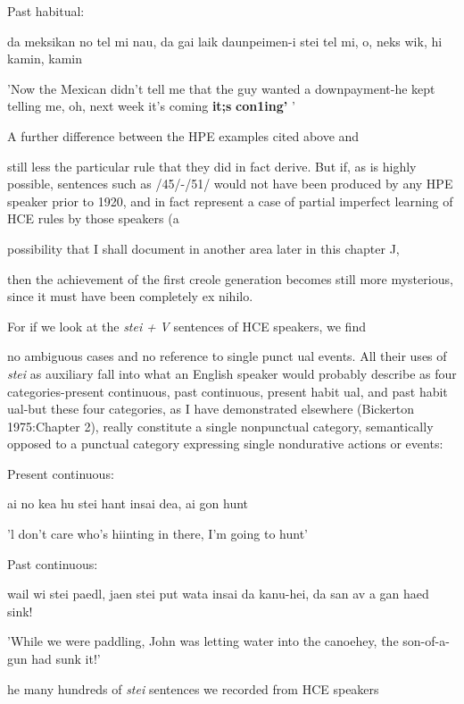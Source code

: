 \ea\label{ex:55}

\glt
\z

Past habitual:

da meksikan no tel mi nau, da gai laik daunpeimen{}-i stei tel mi, o, neks wik, hi kamin, kamin

'Now the Mexican didn't tell me that the guy wanted a down\-payment-he kept telling me, oh, next week it's coming \textbf{it;s} \textbf{con1ing' }'

A further difference between the HPE examples cited above and

still less the particular rule that they did in fact derive. But if, as is highly possible, sentences such as /45/-/51/ would not have been produced by any HPE speaker prior to 1920, and in fact represent a case of partial imperfect learning of HCE rules by those speakers (a

possibility that I shall document in another area later in this chapter J,

then the achievement of the first creole generation becomes still more mysterious, since it must have been completely ex nihilo.

For if we look at the \textit{stei} \textit{+} \textit{V} sentences of HCE speakers, we find

no ambiguous cases and no reference to single punct ual events. All their uses of \textit{stei} as auxiliary fall into what an English speaker would probably describe as four categories-present continuous, past con\-tinuous, present habit ual, and past habit ual-but these four categories, as I have demonstrated elsewhere (Bickerton 1975:Chapter 2), really constitute a single nonpunctual category, semantically opposed to a punctual category expressing single nondurative actions or events:

\ea\label{ex:52}
Present continuous:
\glt
\z

ai no kea hu stei hant insai dea, ai gon hunt

'l don't care who's hiinting in there, I'm going to hunt'

\ea\label{ex:53}
Past continuous:
\glt
\z

wail wi stei paedl, jaen stei put wata insai da kanu-hei, da san av a gan haed sink!

'While we were paddling, John was letting water into the canoe\-hey, the son-of-a-gun had sunk it!'

he many hundreds of \textit{stei} sentences we recorded from HCE speakers


